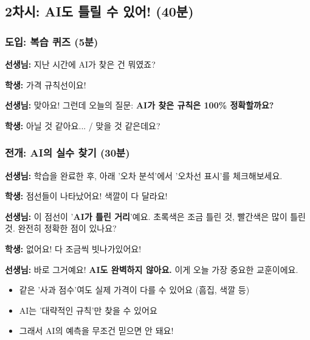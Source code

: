 \documentclass[12pt,a4paper]{article}
\begin{document}
\subsection{2차시: AI도 틀릴 수 있어! (40분)}

\subsubsection{도입: 복습 퀴즈 (5분)}

\begin{tcolorbox}[colback=lightcyan,colframe=cyan]
 \textbf{선생님:} 지난 시간에 AI가 찾은 건 뭐였죠?

 \textbf{학생:} 가격 규칙선이요!

 \textbf{선생님:} 맞아요! 그런데 오늘의 질문: \textbf{AI가 찾은 규칙은 100\% 정확할까요?}

 \textbf{학생:} 아닐 것 같아요... / 맞을 것 같은데요?
\end{tcolorbox}

\subsubsection{전개: AI의 실수 찾기 (30분)}

\begin{tcolorbox}[colback=lightgray,colframe=gray,title=\textbf{【활동 3: 오차선 탐정 놀이 - 10분】 \texttwemoji{magnifying glass tilted left}}]
 \textbf{선생님:} 학습을 완료한 후, 아래 '오차 분석'에서 '오차선 표시'를 체크해보세요.

\vspace{0.2cm}
 \textbf{학생:} 점선들이 나타났어요! 색깔이 다 달라요!

\vspace{0.2cm}
 \textbf{선생님:} 이 점선이 '\textbf{AI가 틀린 거리}'예요. 초록색은 조금 틀린 것, 빨간색은 많이 틀린 것. 완전히 정확한 점이 있나요?

\vspace{0.2cm}
 \textbf{학생:} 없어요! 다 조금씩 빗나가있어요!

\vspace{0.2cm}
 \textbf{선생님:} 바로 그거예요! \textbf{AI도 완벽하지 않아요.} 이게 오늘 가장 중요한 교훈이에요.
\end{tcolorbox}

\begin{tcolorbox}[colback=lightyellow,colframe=orange,title=\textbf{\texttwemoji{light bulb} 교육 포인트: AI의 한계}]
\begin{itemize}
    \item 같은 '사과 점수'여도 실제 가격이 다를 수 있어요 (흠집, 색깔 등)
    \item AI는 '대략적인 규칙'만 찾을 수 있어요
    \item 그래서 AI의 예측을 무조건 믿으면 안 돼요!
\end{itemize}
\end{tcolorbox}
\end{document}
